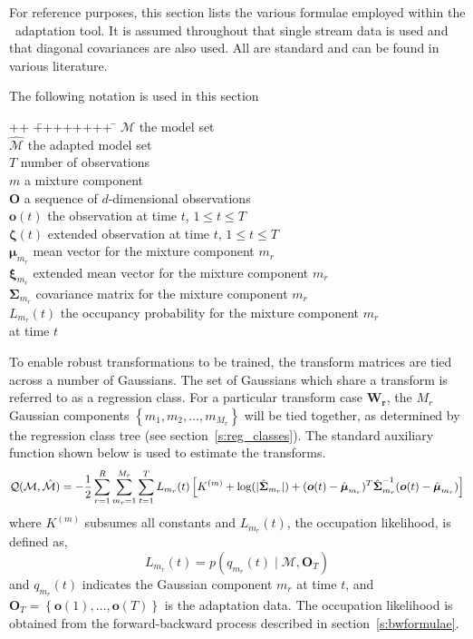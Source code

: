 For reference purposes, this section lists the various formulae
employed within the \HTK\ adaptation tool. It is assumed throughout
that single stream data is used and that diagonal covariances are also
used. All are standard and can be found in various literature.
 
The following notation is used in this section
\begin{tabbing}
++ \= ++++++++ \= \kill
\> $\mathcal{M}$ \> the model set\\
\> $\hat{\mathcal{M}}$ \> the adapted model set\\
\> $T$ \> number of observations \\
\> $m$ \> a mixture component \\
\> $\bm{O}$      \> a sequence of $d$-dimensional observations \\
\> $\bm{o}(t)$    \> the observation at time $t$, $1 \leq t \leq T $\\
\> $\bm{\zeta}(t)$\> extended observation at time $t$, $1 \leq t \leq T $
\\
\> $\bm{\mu}_{m_r}$  \> mean vector for the mixture component $m_r$\\
\> $\bm{\xi}_{m_r}$  \> extended mean vector for the mixture component $m_r$\\
\> $\bm{\Sigma}_{m_r}$  \> covariance matrix for the mixture component $m_r$ \\
\> $L_{m_r}(t)$ \> the occupancy probability for the mixture component $m_r$\\
\>              \>   at time $t$        
\end{tabbing}

To enable robust transformations to be trained, the transform matrices
are tied across a number of Gaussians. The set of Gaussians which
share a transform is referred to as a regression class.  For a
particular transform case $\bm{W_r}$, the $M_r$ Gaussian components
$\left\{m_1, m_2, \dots, m_{M_r}\right\}$ will be tied together, as
determined by the regression class tree (see
section~\ref{s:reg_classes}).  The standard auxiliary
function shown below is used to estimate the transforms.
\newcommand{\like}{L_{m_r}(t)}
\begin{eqnarray}
{\cal Q}({\cal M},{\hat{\cal M}}) = 
- \frac{1}{2}
\sum_{r=1}^R
\sum_{m_r=1}^{M_r}
\sum_{t=1}^T
\like\left[
K^{(m)}+\log(|{\hat{\bm\Sigma}}_{m_r}|)+({\bm o}(t)-
{\hat{\bm\mu}}_{m_r})^T{{\hat{\bm\Sigma}}}_{m_r}^{-1}({\bm o}(t)-{\hat{\bm\mu}}_{m_r})
\right] \nonumber
\end{eqnarray}
where $K^{(m)}$ subsumes all constants and $\like$, the occupation likelihood, is defined as,
\[ 
         \like = p(q_{m_r}(t)\;|\;\mathcal{M}, \bm{O}_T)
\]
and $q_{m_r}(t)$ indicates the Gaussian component $m_r$ at time $t$,
and $\bm{O}_T = \left\{\bm{o}(1),\dots,\bm{o}(T)\right\}$ is the
adaptation data. The occupation likelihood is obtained from the
forward-backward process described in section~\ref{s:bwformulae}.



